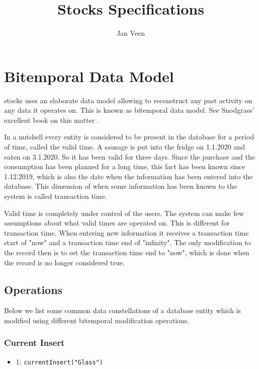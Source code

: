 \documentclass{memoir}
\title{Stocks Specifications}
\author{Jan Veen}
\begin{document}
\maketitle
\frontmatter

\tableofcontents
\listoffigures
\listoftables
\mainmatter

\chapter{Bitemporal Data Model}

stocks uses an elaborate data model allowing to reconstruct any past activity on any data it operates on. This is known as bitemporal data model. See Snodgrass' excellent book on this matter \cite{snodgrass}.

In a nutshell every entity is considered to be present in the database for a period of time, called the valid time. A sausage is put into the fridge on 1.1.2020 and eaten on 3.1.2020. So it has been valid for three days. Since the purchase and the consumption has been planned for a long time, this fact has been known since 1.12.2019, which is also the date when the information has been entered into the database. This dimension of when some information has been known to the system is called transaction time.

Valid time is completely under control of the users. The system can make few assumptions about what valid times are operated on. This is different for transaction time. When entering new information it receives a transaction time start of "now" and a transaction time end of "infinity". The only modification to the record then is to set the transaction time end to "now", which is done when the record is no longer considered true.

\section{Operations}

Below we list some common data constellations of a database entity which is modified using different bitemporal modification operations.

\subsection{Current Insert}

\begin{itemize}
\item 1: \texttt{currentInsert("Glass")}
\end{itemize}
\end{document}
